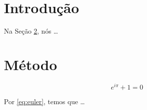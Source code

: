 \documentclass{article}
\begin{document}
\section{Introdução}
\label{sec:intro}

Na Seção \ref{sec:metodo}, nós \ldots

\section{Método}
\label{sec:metodo}

\begin{equation}
\label{eq:euler}
e^{i\pi} + 1 = 0
\end{equation}

Por \eqref{eq:euler}, temos que \ldots
\end{document}

